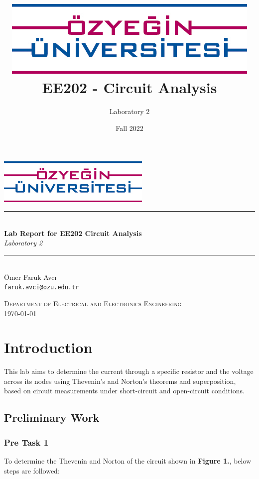 \documentclass{article}
\title{\includegraphics[scale=0.65]{images/ozu.png}\\
\textbf{EE202 - Circuit Analysis}}
\subtitle{Laboratory 2}
\date{Fall 2022}
\newcommand{\HRule}{\rule{\linewidth}{0.5mm}}
\begin{document}
\begin{titlepage}
\begin{center}

\includegraphics[width=0.55\textwidth]{ozu.png}~\\[2cm]

\HRule \\[0.4cm]
{ \LARGE 
  \textbf{Lab Report for EE202 Circuit Analysis}\\[0.4cm]
  \emph{Laboratory 2}\\[0.4cm]
}
\HRule \\[1.5cm]

{ \large
  Ömer Faruk Avcı \\[0.1cm]
  \texttt{faruk.avci@ozu.edu.tr}
}

\vfill

\textsc{\large Department of Electrical and Electronics Engineering}\\[0.4cm]


{\large \today}
 
\end{center}
\end{titlepage}



\newpage


\section{Introduction}
This lab aims to determine the current through a specific resistor and the voltage across its nodes using Thevenin’s and Norton’s theorems and superposition, based on circuit measurements under short-circuit and open-circuit conditions.

\subsection{Preliminary Work}
\subsubsection{Pre Task 1}
To determine the Thevenin and Norton of the circuit shown in \textbf{Figure 1.}, below steps are followed:
\end{document}
